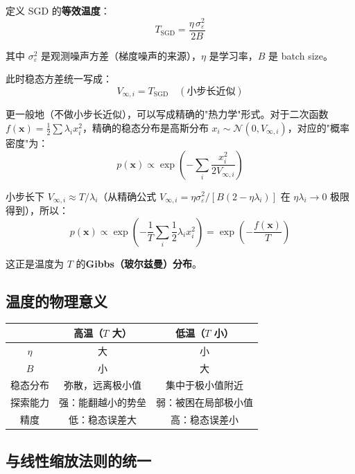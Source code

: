 \documentclass[12pt, a4paper]{ctexart}
\begin{document}
定义 SGD 的\textbf{等效温度}：
\begin{equation}
    \boxed{T_{\text{SGD}} = \frac{\eta\,\sigma_\varepsilon^2}{2B}}
\end{equation}

其中 $\sigma_\varepsilon^2$ 是观测噪声方差（梯度噪声的来源），$\eta$ 是学习率，$B$ 是 batch size。

此时稳态方差统一写成：
\begin{equation}
    V_{\infty,i} = T_{\text{SGD}} \quad (\text{小步长近似})
\end{equation}

更一般地（不做小步长近似），可以写成精确的"热力学"形式。对于二次函数 $f(\bm{x}) = \frac{1}{2}\sum \lambda_i x_i^2$，精确的稳态分布是高斯分布 $x_i \sim \mathcal{N}(0, V_{\infty,i})$，对应的"概率密度"为：
\begin{equation}
    p(\bm{x}) \propto \exp\left(-\sum_i \frac{x_i^2}{2V_{\infty,i}}\right)
\end{equation}

小步长下 $V_{\infty,i} \approx T/\lambda_i$（从精确公式 $V_{\infty,i} = \eta\sigma_\varepsilon^2/[B(2-\eta\lambda_i)]$ 在 $\eta\lambda_i \to 0$ 极限得到），所以：
\begin{equation}
    p(\bm{x}) \propto \exp\left(-\frac{1}{T}\sum_i \frac{1}{2}\lambda_i x_i^2\right) = \exp\left(-\frac{f(\bm{x})}{T}\right)
\end{equation}

这正是温度为 $T$ 的\textbf{Gibbs（玻尔兹曼）分布}。

\subsection{温度的物理意义}

\begin{center}
\begin{tabular}{c|cc}
 & 高温（$T$ 大）& 低温（$T$ 小）\\
\hline
$\eta$ & 大 & 小 \\
$B$ & 小 & 大 \\
稳态分布 & 弥散，远离极小值 & 集中于极小值附近 \\
探索能力 & 强：能翻越小的势垒 & 弱：被困在局部极小值 \\
精度 & 低：稳态误差大 & 高：稳态误差小 \\
\end{tabular}
\end{center}

\subsection{与线性缩放法则的统一}
\end{document}
